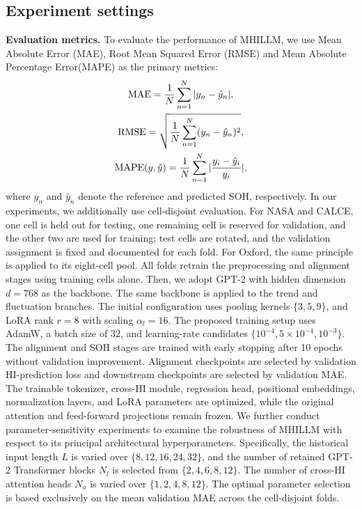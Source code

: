 \documentclass[preprint,12pt]{elsarticle}
\begin{document}
\subsection{Experiment settings}
\textbf{Evaluation metrics.} To evaluate the performance of MHILLM, we use Mean Absolute Error (MAE), Root Mean Squared Error (RMSE) and Mean Absolute Percentage Error(MAPE) as the primary metrics:
\begin{gather}
\operatorname{MAE}=\frac{1}{N}\sum_{n=1}^{N}|y_n-\hat y_n|,\\
\operatorname{RMSE}=\sqrt{\frac{1}{N}\sum_{n=1}^{N}(y_n-\hat y_n)^2}, \\
{\rm MAPE}(y, \hat{y}) = \frac{1}{N}\sum_{n=1}^{N}|\frac{y_i - \hat{y}_i}{y_i}|,
\end{gather}
where $y_n$ and $\hat y_n$ denote the reference and predicted SOH, respectively. In our experiments, we additionally use cell-disjoint evaluation. For NASA and CALCE, one cell is held out for testing, one remaining cell is reserved for validation, and the other two are used for training; test cells are rotated, and the validation assignment is fixed and documented for each fold. For Oxford, the same principle is applied to its eight-cell pool.  All folds retrain the preprocessing and alignment stages using training cells alone. Then, we adopt GPT-2 with hidden dimension $d=768$ as the backbone. The same backbone is applied to the trend and fluctuation branches. The initial configuration uses pooling kernels $\{3,5,9\}$, and LoRA rank $r=8$ with scaling $\alpha_l=16$. The proposed training setup uses AdamW, a batch size of 32, and learning-rate candidates $\{10^{-4},5\times10^{-4},10^{-3}\}$. The alignment and SOH stages are trained with early stopping after 10 epochs without validation improvement. Alignment checkpoints are selected by validation HI-prediction loss and downstream checkpoints are selected by validation MAE. The trainable tokenizer, cross-HI module, regression head, positional embeddings, normalization layers, and LoRA parameters are optimized, while the original attention and feed-forward projections remain frozen.
We further conduct parameter-sensitivity experiments to examine the robustness of MHILLM with respect to its principal architectural
hyperparameters. Specifically, the historical input length $L$ is varied over $\{8,12,16,24,32\}$, and the number of retained GPT-2 Transformer
blocks $N_l$ is selected from $\{2,4,6,8,12\}$. The number of cross-HI attention heads $N_a$ is varied over $\{1,2,4,8,12\}$.  The optimal
parameter selection is based exclusively on the mean validation MAE across the cell-disjoint folds.
\end{document}

